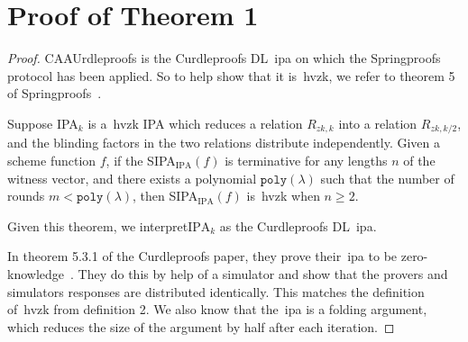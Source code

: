 
\section{Proof of Theorem 1}\label{sec:appendix-thm1proof}
\begin{proof}
    CAAUrdleproofs is the Curdleproofs DL~\gls{ipa} on which the Springproofs protocol has been applied.
    So to help show that it is~\gls{hvzk}, we refer to theorem 5 of Springproofs~\cite{zhang2024springproofs}.
    \begin{theorem}
        Suppose IPA$_k$ is a~\gls{hvzk} IPA which reduces a relation $R_{zk,k}$ into a relation $R_{zk,k/2}$, and the blinding factors in the two relations distribute independently.
        Given a scheme function $f$, if the SIPA$_{\text{IPA}}(f)$ is terminative for any lengths $n$ of the witness vector, and there exists a polynomial $\texttt{poly}(\lambda)$ such that the number of rounds $m<\texttt{poly}(\lambda)$, then SIPA$_{\text{IPA}}(f)$ is~\gls{hvzk} when $n\geq2$.
    \end{theorem}
    Given this theorem, we interpret$\text{IPA}_k$ as the Curdleproofs DL~\gls{ipa}.

    In theorem 5.3.1 of the Curdleproofs paper, they prove their~\gls{ipa} to be zero-knowledge~\cite{Curdleproofs}.
    They do this by help of a simulator and show that the provers and simulators responses are distributed identically.
    This matches the definition of~\gls{hvzk} from definition 2.
    We also know that the~\gls{ipa} is a folding argument, which reduces the size of the argument by half after each iteration.
\end{proof}


